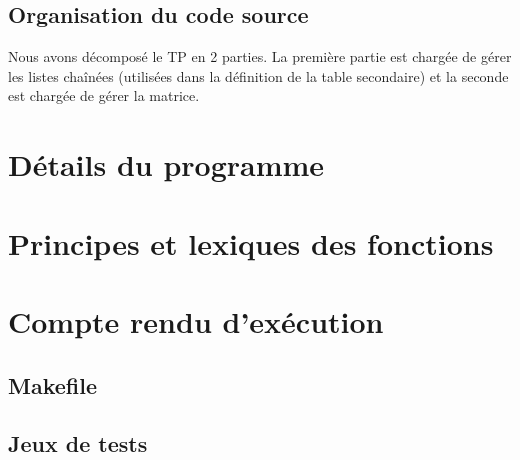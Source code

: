 \documentclass{report}
\begin{document}
    
    \section{Organisation du code source}
      Nous avons décomposé le TP en 2 parties. La première partie est chargée de gérer les listes chaînées (utilisées dans la définition de la table secondaire) et la seconde est chargée de gérer la matrice.

    
  \chapter{Détails du programme}
    

  \chapter{Principes et lexiques des fonctions}
    

  \chapter{Compte rendu d'exécution}
    \section{Makefile}

    \section{Jeux de tests}
%      
\end{document}
